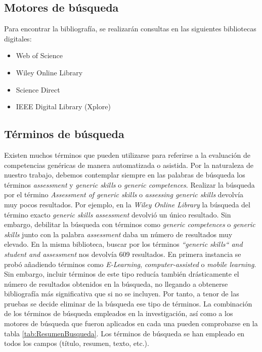 
\subsection{Motores de búsqueda}
\label{sec:MotoresBusqueda}
Para encontrar la bibliografía, se realizarán consultas en las siguientes bibliotecas digitales: 
\begin{itemize}
\item Web of Science
\item Wiley Online Library
\item Science Direct
\item IEEE Digital Library (Xplore)
\end{itemize}

\subsection{Términos de búsqueda}
\label{sec:TerminosBusqueda}
Existen muchos términos que pueden utilizarse para referirse a la evaluación de competencias genéricas de manera automatizada o asistida. Por la naturaleza de nuestro trabajo, debemos contemplar siempre en las palabras de búsqueda los términos \emph{assessment} y \emph{generic skills} o \emph{generic competences}. Realizar la búsqueda por el término \emph{Assessment of generic skills} o \emph{assessing generic skills} devolvía muy pocos resultados. Por ejemplo, en la \emph{Wiley Online Library} la búsqueda del término exacto \emph{generic skills assessment} devolvió un único resultado. Sin embargo, debilitar la búsqueda con términos como \emph{generic competences} o \emph{generic skills} junto con la palabra \emph{assessment} daba un número de resultados muy elevado. En la misma biblioteca, buscar por los términos \emph{``generic skills`` and student and assessment} nos devolvía 609 resultados. En primera instancia se probó añadiendo términos como  \emph{E-Learning}, \emph{computer-assisted} o \emph{mobile learning}. Sin embargo, incluir términos de este tipo reducía también drásticamente el número de resultados obtenidos en la búsqueda, no llegando a obtenerse bibliografía más significativa que si no se incluyen. Por tanto, a tenor de las pruebas se decide eliminar de la búsqueda ese tipo de términos. La combinación de los términos de búsqueda empleados en la investigación, así como a los motores de búsqueda que fueron aplicados en cada una pueden comprobarse en la tabla \ref{tab:ResumenBusqueda}. Los términos de búsqueda se han empleado en todos los campos (título, resumen, texto, etc.).

